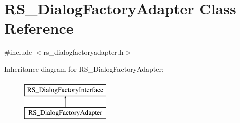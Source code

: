 \hypertarget{classRS__DialogFactoryAdapter}{\section{R\-S\-\_\-\-Dialog\-Factory\-Adapter Class Reference}
\label{classRS__DialogFactoryAdapter}
}


{\ttfamily \#include $<$rs\-\_\-dialogfactoryadapter.\-h$>$}

Inheritance diagram for R\-S\-\_\-\-Dialog\-Factory\-Adapter\-:\begin{figure}[H]
\begin{center}
\leavevmode
\includegraphics[height=2.000000cm]{classRS__DialogFactoryAdapter}
\end{center}
\end{figure}

